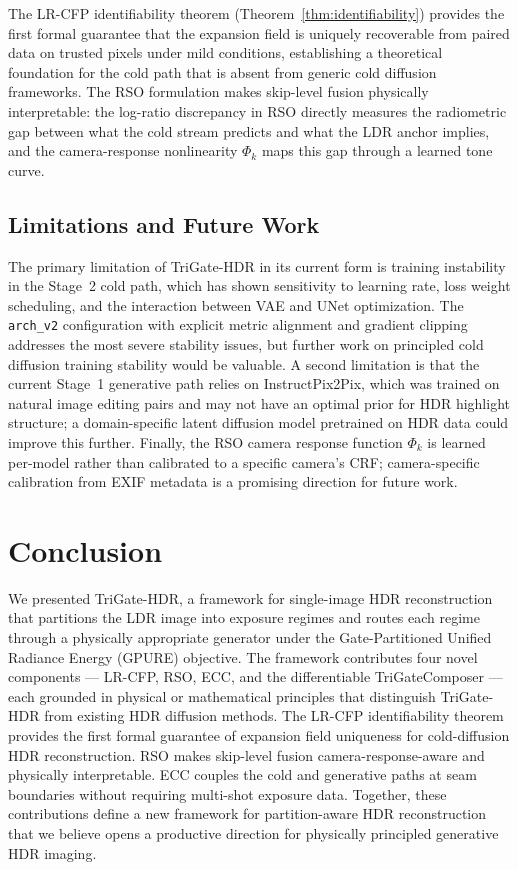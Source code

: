 \documentclass[10pt,twocolumn,letterpaper]{article}
\begin{document}
The LR-CFP identifiability theorem (Theorem~\ref{thm:identifiability}) provides the first formal guarantee that the expansion field is uniquely recoverable from paired data on trusted pixels under mild conditions, establishing a theoretical foundation for the cold path that is absent from generic cold diffusion frameworks. The RSO formulation makes skip-level fusion physically interpretable: the log-ratio discrepancy in RSO directly measures the radiometric gap between what the cold stream predicts and what the LDR anchor implies, and the camera-response nonlinearity $\Phi_k$ maps this gap through a learned tone curve.

\subsection{Limitations and Future Work}

The primary limitation of TriGate-HDR in its current form is training instability in the Stage~2 cold path, which has shown sensitivity to learning rate, loss weight scheduling, and the interaction between VAE and UNet optimization. The \texttt{arch\_v2} configuration with explicit metric alignment and gradient clipping addresses the most severe stability issues, but further work on principled cold diffusion training stability would be valuable. A second limitation is that the current Stage~1 generative path relies on InstructPix2Pix, which was trained on natural image editing pairs and may not have an optimal prior for HDR highlight structure; a domain-specific latent diffusion model pretrained on HDR data could improve this further. Finally, the RSO camera response function $\Phi_k$ is learned per-model rather than calibrated to a specific camera's CRF; camera-specific calibration from EXIF metadata is a promising direction for future work.

\section{Conclusion}
\label{sec:conclusion}

We presented TriGate-HDR, a framework for single-image HDR reconstruction that partitions the LDR image into exposure regimes and routes each regime through a physically appropriate generator under the Gate-Partitioned Unified Radiance Energy (GPURE) objective. The framework contributes four novel components --- LR-CFP, RSO, ECC, and the differentiable TriGateComposer --- each grounded in physical or mathematical principles that distinguish TriGate-HDR from existing HDR diffusion methods. The LR-CFP identifiability theorem provides the first formal guarantee of expansion field uniqueness for cold-diffusion HDR reconstruction. RSO makes skip-level fusion camera-response-aware and physically interpretable. ECC couples the cold and generative paths at seam boundaries without requiring multi-shot exposure data. Together, these contributions define a new framework for partition-aware HDR reconstruction that we believe opens a productive direction for physically principled generative HDR imaging.

{\small


}
\end{document}
